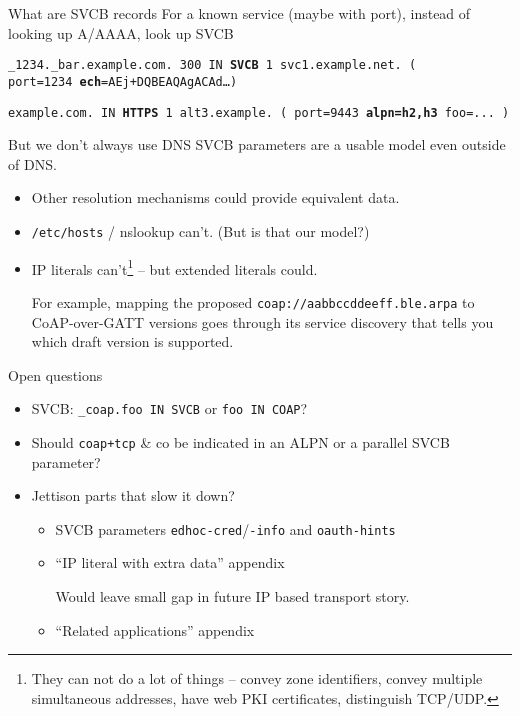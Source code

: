 \begin{frame}{What are SVCB records}\Large
    For a known service (maybe with port), instead of looking up A/AAAA, look up SVCB

    \bigskip

    \texttt{\_1234.\_bar.example.com. 300 IN \textbf{SVCB} 1 svc1.example.net. (\\
    port=1234 \textbf{ech}=AEj+DQBEAQAgACAd…)}

    \texttt{example.com. IN \textbf{HTTPS} 1 alt3.example. (
    port=9443 \textbf{alpn=h2,h3} foo=... )}
\end{frame}

\begin{frame}{But we don't always use DNS}\Large
    SVCB parameters are a usable model even outside of DNS.

    \begin{itemize}
        \item Other resolution mechanisms could provide equivalent data.
        \item \texttt{/etc/hosts} / nslookup can't. (But is that our model?)
        \item IP literals can't\footnote{They can not do a lot of things -- convey zone identifiers, convey multiple simultaneous addresses, have web PKI certificates, distinguish TCP/UDP.} -- but extended literals could.

            For example, mapping the proposed \texttt{coap://aabbccddeeff.ble.arpa} to CoAP-over-GATT versions
            goes through its service discovery that tells you which draft version is supported.
    \end{itemize}
\end{frame}

\begin{frame}{Open questions}
    \begin{itemize}
        \item SVCB: \texttt{\_coap.foo IN SVCB} or \texttt{foo IN COAP}?
        \item Should \texttt{coap+tcp} \& co be indicated in an ALPN or a parallel SVCB parameter?
        \item Jettison parts that slow it down?
            \begin{itemize}\Large
                \item SVCB parameters \texttt{edhoc-cred}/\texttt{-info} and \texttt{oauth-hints}
                \item ``IP literal with extra data'' appendix

                    Would leave small gap in future IP based transport story.
                \item ``Related applications'' appendix
            \end{itemize}
    \end{itemize}
\end{frame}

